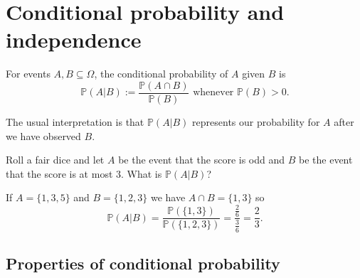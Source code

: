 \documentclass[10pt, a4paper]{article}
\newcommand{\Po}{\mathbb{P}}
\begin{document}
\section{Conditional probability and independence}

\begin{definition}
    For events $A, B \subseteq \Omega$, the conditional probability of $A$ given $B$ is
    \[
    \Po(A | B) := \frac{\Po (A \cap B)}{\Po (B)}\text{ whenever } \Po(B) > 0.
    \]
\end{definition}
The usual interpretation is that $\Po(A | B)$ represents our probability for $A$ after we have observed $B$.

\begin{example}
    Roll a fair dice and let $A$ be the event that the score is odd and $B$ be the event that the score is at most $3$. What is $\Po (A | B)$?

    If $A = \{1, 3, 5\}$ and $B = \{1, 2, 3\}$ we have $A \cap B = \{1, 3\}$ so
    \[
    \Po (A | B) = \frac{\Po(\{1, 3\})}{\Po(\{1, 2, 3\})} = \frac{\frac{2}{6}}{\frac{3}{6}} = \frac{2}{3}.
    \]
\end{example}

\subsection{Properties of conditional probability}
\end{document}

